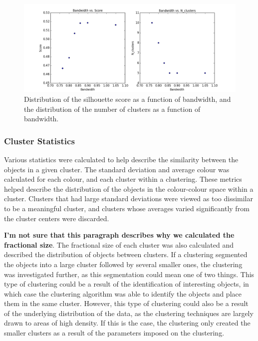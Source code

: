 \begin{figure}[H]
\centering
\includegraphics[width=\linewidth]{figs/methods/meanshift_parameters}
\caption{Distribution of the silhouette score as a function of bandwidth, and the distribution of the number of clusters as a function of bandwidth.}
\label{fig:bwscore}
\end{figure}

\subsubsection{Cluster Statistics}
Various statistics were calculated to help describe the similarity between the objects in a given cluster.
The standard deviation and average colour was calculated for each colour, and each cluster within a clustering. 
These metrics helped describe the distribution of the objects in the colour-colour space within a cluster. 
Clusters that had large standard deviations were viewed as too dissimilar to be a meaningful cluster, and clusters whose averages varied significantly from the cluster centers were discarded.

\textbf{I'm not sure that this paragraph describes why we calculated the fractional size}.
The fractional size of each cluster was also calculated and described the distribution of objects between clusters.
If a clustering segmented the objects into a large cluster followed by several smaller ones, the clustering was investigated further, as this segmentation could mean one of two things. 
This type of clustering could be a result of the identification of interesting objects, in which case the clustering algorithm was able to identify the objects and place them in the same cluster.
However, this type of clustering could also be a result of the underlying distribution of the data, as the clustering techniques are largely drawn to areas of high density.
If this is the case, the clustering only created the smaller clusters as a result of the parameters imposed on the clustering.
